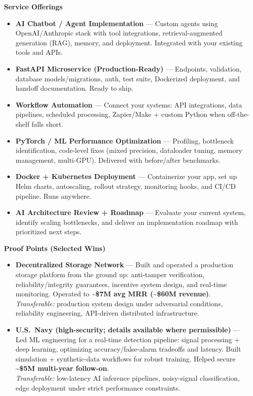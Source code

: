 \documentclass[10.5pt]{res}
\begin{document}
\begin{resume}
{\bf Service Offerings} \\
\begin{itemize}
    \item \textbf{AI Chatbot / Agent Implementation} --- Custom agents using OpenAI/Anthropic stack with tool integrations, retrieval-augmented generation (RAG), memory, and deployment. Integrated with your existing tools and APIs.
    \item \textbf{FastAPI Microservice (Production-Ready)} --- Endpoints, validation, database models/migrations, auth, test suite, Dockerized deployment, and handoff documentation. Ready to ship.
    \item \textbf{Workflow Automation} --- Connect your systems: API integrations, data pipelines, scheduled processing, Zapier/Make + custom Python when off-the-shelf falls short.
    \item \textbf{PyTorch / ML Performance Optimization} --- Profiling, bottleneck identification, code-level fixes (mixed precision, dataloader tuning, memory management, multi-GPU). Delivered with before/after benchmarks.
    \item \textbf{Docker + Kubernetes Deployment} --- Containerize your app, set up Helm charts, autoscaling, rollout strategy, monitoring hooks, and CI/CD pipeline. Runs anywhere.
    \item \textbf{AI Architecture Review + Roadmap} --- Evaluate your current system, identify scaling bottlenecks, and deliver an implementation roadmap with prioritized next steps.
\end{itemize}

{\bf Proof Points (Selected Wins)} \\
\begin{itemize}
    \item \textbf{Decentralized Storage Network} --- Built and operated a production storage platform from the ground up: anti-tamper verification, reliability/integrity guarantees, incentive system design, and real-time monitoring. Operated to \textbf{\textasciitilde\$7M avg MRR (\textasciitilde\$60M revenue)}.\\
    \textit{Transferable:} production system design under adversarial conditions, reliability engineering, API-driven distributed infrastructure.

    \item \textbf{U.S.\ Navy (high-security; details available where permissible)} --- Led ML engineering for a real-time detection pipeline: signal processing + deep learning, optimizing accuracy/false-alarm tradeoffs and latency. Built simulation + synthetic-data workflows for robust training. Helped secure \textbf{\textasciitilde\$5M multi-year follow-on}.\\
    \textit{Transferable:} low-latency AI inference pipelines, noisy-signal classification, edge deployment under strict performance constraints.


\end{itemize}
\end{resume}
\end{document}
